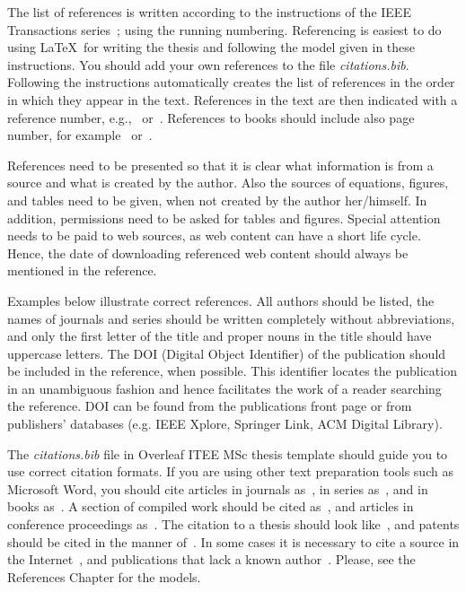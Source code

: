 The list of references is written according to the instructions of the IEEE Transactions series~\cite{ieeetransactions}; using the running numbering. Referencing is easiest to do using \LaTeX\ for writing the thesis and following the model given in these instructions. You should add your own references to the file \textit{citations.bib}. Following the instructions automatically creates the list of references in the order in which they appear in the text. References in the text are then indicated with a reference number, e.g.,~\cite{lappalainen} or~\cite{lappalainen, acta, korpela}. References to books should include also page number, for example~\cite[p.~15]{lappalainen} or~\cite[pp.~15--17]{lappalainen}.

References need to be presented so that it is clear what information is from a source and what is created by the author. Also the sources of equations, figures, and tables need to be given, when not created by the author her/himself. In addition, permissions need to be asked for tables and figures. Special attention needs to be paid to web sources, as web content can have a short life cycle. Hence, the date of downloading referenced web content should always be mentioned in the reference.

Examples below illustrate correct references. All authors should be listed, the names of journals and series should be written completely without abbreviations, and only the first letter of the title and proper nouns in the title should have uppercase letters. The DOI (Digital Object Identifier) of the publication should be included in the reference, when possible. This identifier locates the publication in an unambiguous fashion and hence facilitates the work of a reader searching the reference. DOI can be found from the publications front page or from publishers’ databases (e.g. IEEE Xplore, Springer Link, ACM Digital Library).

The \textit{citations.bib} file in Overleaf ITEE MSc thesis template should guide you to use correct citation formats. If you are using other text preparation tools such as Microsoft Word, you should cite articles in journals  as~\cite{ojala:2002}, in series as~\cite{riekki:1998}, and in books as~\cite{pietikainen:2011}. A section of compiled work should be cited as~\cite{cvejic:2005}, and articles in conference proceedings as~\cite{heikkila:1997}. The citation to a thesis should look like~\cite{heikkinen:2011}, and patents should be cited in the manner of~\cite{toivonen:2004}. In some cases it is necessary to cite a source in the Internet~\cite{korpela}, and publications that lack a known author~\cite{asuntoliitto_asumistaso_1969}. Please, see the References Chapter for the models.

